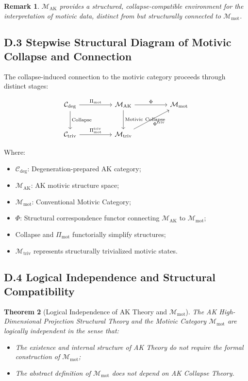 \documentclass[11pt]{article}
\newtheorem{theorem}{Theorem}[section]
\newtheorem{remark}[theorem]{Remark}
\begin{document}
\begin{remark}
$\mathcal{M}_{\mathrm{AK}}$ provides a structured, collapse-compatible environment for the interpretation of motivic data, distinct from but structurally connected to $\mathcal{M}_{\mathrm{mot}}$.
\end{remark}

\subsection*{D.3 Stepwise Structural Diagram of Motivic Collapse and Connection}

The collapse-induced connection to the motivic category proceeds through distinct stages:

\[
\begin{tikzcd}[column sep=huge, row sep=large]
\mathcal{C}_{\mathrm{deg}} \arrow[r, "\Pi_{\mathrm{mot}}"] \arrow[d, "\mathrm{Collapse}"]
& \mathcal{M}_{\mathrm{AK}} \arrow[d, "\mathrm{Motivic\ Collapse}"] \arrow[r, "\Phi"]
& \mathcal{M}_{\mathrm{mot}} \\
\mathcal{C}_{\mathrm{triv}} \arrow[r, "\Pi_{\mathrm{mot}}^{\mathrm{triv}}"]
& \mathcal{M}_{\mathrm{triv}} \arrow[ru, "\Phi^{\mathrm{triv}}"']
\end{tikzcd}
\]

Where:

\begin{itemize}
    \item $\mathcal{C}_{\mathrm{deg}}$: Degeneration-prepared AK category;
    \item $\mathcal{M}_{\mathrm{AK}}$: AK motivic structure space;
    \item $\mathcal{M}_{\mathrm{mot}}$: Conventional Motivic Category;
    \item $\Phi$: Structural correspondence functor connecting $\mathcal{M}_{\mathrm{AK}}$ to $\mathcal{M}_{\mathrm{mot}}$;
    \item Collapse and $\Pi_{\mathrm{mot}}$ functorially simplify structures;
    \item $\mathcal{M}_{\mathrm{triv}}$ represents structurally trivialized motivic states.
\end{itemize}

\subsection*{D.4 Logical Independence and Structural Compatibility}

\begin{theorem}[Logical Independence of AK Theory and $\mathcal{M}_{\mathrm{mot}}$]
The AK High-Dimensional Projection Structural Theory and the Motivic Category $\mathcal{M}_{\mathrm{mot}}$ are logically independent in the sense that:

\begin{itemize}
    \item The existence and internal structure of AK Theory do not require the formal construction of $\mathcal{M}_{\mathrm{mot}}$;
    \item The abstract definition of $\mathcal{M}_{\mathrm{mot}}$ does not depend on AK Collapse Theory.
\end{itemize}
\end{theorem}
\end{document}
